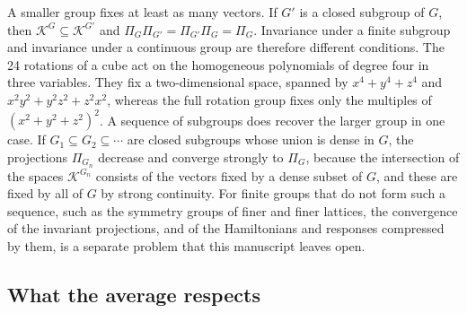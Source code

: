 A smaller group fixes at least as many vectors. If $G'$ is a closed subgroup of $G$, then $\mathcal K^G\subseteq\mathcal K^{G'}$ and $\Pi_G\Pi_{G'}=\Pi_{G'}\Pi_G=\Pi_G$. Invariance under a finite subgroup and invariance under a continuous group are therefore different conditions. The 24 rotations of a cube act on the homogeneous polynomials of degree four in three variables. They fix a two-dimensional space, spanned by $x^4+y^4+z^4$ and $x^2y^2+y^2z^2+z^2x^2$, whereas the full rotation group fixes only the multiples of $(x^2+y^2+z^2)^2$. A sequence of subgroups does recover the larger group in one case. If $G_1\subseteq G_2\subseteq\cdots$ are closed subgroups whose union is dense in $G$, the projections $\Pi_{G_n}$ decrease and converge strongly to $\Pi_G$, because the intersection of the spaces $\mathcal K^{G_n}$ consists of the vectors fixed by a dense subset of $G$, and these are fixed by all of $G$ by strong continuity. For finite groups that do not form such a sequence, such as the symmetry groups of finer and finer lattices, the convergence of the invariant projections, and of the Hamiltonians and responses compressed by them, is a separate problem that this manuscript leaves open.

\subsection{What the average respects}
\label{subsec:symmetry-compatibility}

